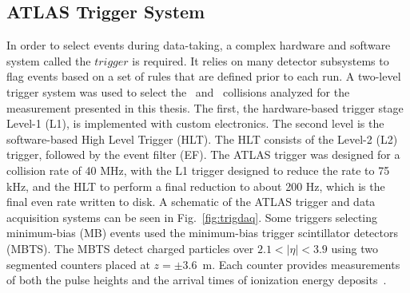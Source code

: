 \subsection{ATLAS Trigger System}
\label{sec:trigger}

In order to select events during data-taking, a complex hardware and software system called the $trigger$ is required. It relies on many detector subsystems to flag events based on a set of rules that are defined prior to each run. A two-level trigger system was used to select the \pp\ and \pPb\ collisions analyzed for the measurement presented in this thesis. The first, the hardware-based trigger stage Level-1 (L1), is implemented with custom electronics. The second level is the software-based High Level Trigger (HLT). The HLT consists of the Level-2 (L2) trigger, followed by the event filter (EF). The ATLAS trigger was designed for a collision rate of 40 MHz, with the L1 trigger designed to reduce the rate to 75 kHz, and the HLT to perform a final reduction to about 200 Hz, which is the final even rate written to disk. A schematic of the ATLAS trigger and data acquisition systems can be seen in Fig.~\ref{fig:trigdaq}. Some triggers selecting minimum-bias (MB) events used the minimum-bias trigger scintillator detectors (MBTS). The MBTS detect charged particles over $2.1 < |\eta| < 3.9$ using two segmented counters placed at $z = \pm 3.6$~m. Each counter provides measurements of both the pulse heights and the arrival times of ionization energy deposits~\cite{Aad:2008zzm}.


